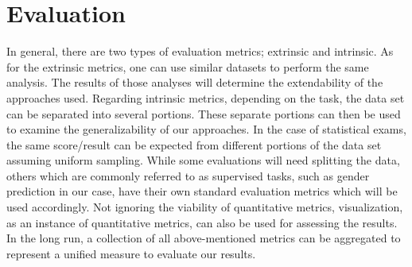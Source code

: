 \documentclass[sigconf,authordraft]{acmart}
\begin{document}
\section{Evaluation}


In general, there are two types of evaluation metrics; extrinsic and intrinsic. As for the extrinsic metrics, one can use similar datasets to perform the same analysis. The results of those analyses will determine the extendability of the approaches used. Regarding intrinsic metrics, depending on the task, the data set can be separated into several portions. These separate portions can then be used to examine the generalizability of our approaches. In the case of statistical exams, the same score/result can be expected from different portions of the data set assuming uniform sampling. While some evaluations will need splitting the data, others which are commonly referred to as supervised tasks, such as gender prediction in our case, have their own standard evaluation metrics which will be used accordingly. Not ignoring the viability of quantitative metrics, visualization, as an instance of quantitative metrics, can also be used for assessing the results. In the long run, a collection of all above-mentioned metrics can be aggregated to represent a unified measure to evaluate our results.
 



\end{document}
